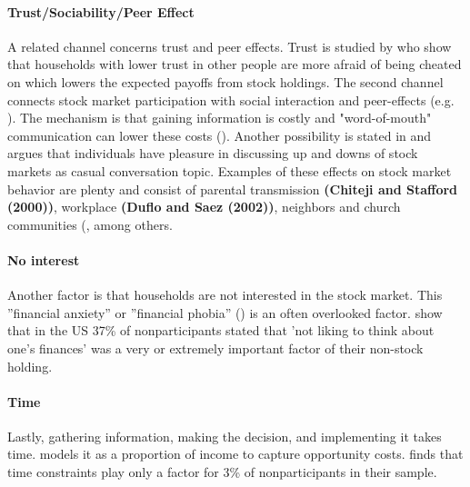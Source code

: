 \documentclass[ProjectABM]{subfiles}
\begin{document}
\paragraph{Trust/Sociability/Peer Effect}
A related channel concerns trust and peer effects. Trust is studied by \cite{guiso_et_al_2008trusting} who show that households with lower trust in other people are more afraid of being cheated on which lowers the expected payoffs from stock holdings.
The second channel connects stock market participation with social interaction and peer-effects (e.g. \cite{georgarakos_pasini_2011, brown_2008, hong_et_al_2004social}). The mechanism is that gaining information is costly and "word-of-mouth" communication can lower these costs (\cite{brown_2008}). Another possibility is stated in \cite{hong_et_al_2004social} and argues that individuals have pleasure in discussing up and downs of stock markets as casual conversation topic. Examples of these effects on stock market behavior are plenty and consist of parental transmission \textbf{(Chiteji and Stafford (2000))}, workplace \textbf{(Duflo and Saez (2002))}, neighbors and church communities (\cite{hong_et_al_2004social, brown_2008}, among others.


\paragraph{No interest}
Another factor is that households are not interested in the stock market. This ''financial anxiety'' or ''financial phobia'' (\cite{shapiro_burchell_2012}) is an often overlooked factor. \cite{choi_2020} show that in the US 37\% of nonparticipants stated that 'not liking to think about one's finances' was a very or extremely important factor of their non-stock holding.

\paragraph{Time}
Lastly, gathering information, making the decision, and implementing it takes time. \cite{bonaparte_et_al_2012adjustment} models it as a proportion of income to capture opportunity costs. \cite{choi_2020} finds that time constraints play only a factor for 3\% of nonparticipants in their sample. %
\end{document}
